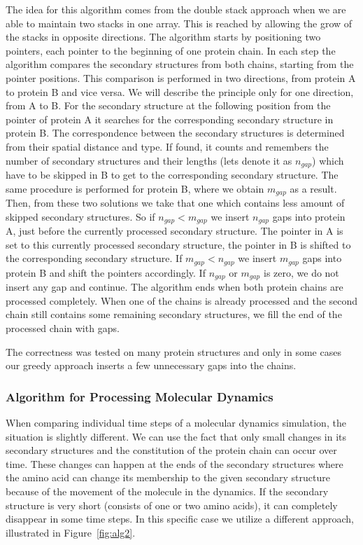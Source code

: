 \documentclass[twocolumn]{bmcart}%
\begin{document}
The idea for this algorithm comes from the double stack approach when we are able to maintain two stacks in one array.
This is reached by allowing the grow of the stacks in opposite directions.
The algorithm starts by positioning two pointers, each pointer to the beginning of one protein chain.
In each step the algorithm compares the secondary structures from both chains, starting from the pointer positions.
This comparison is performed in two directions, from protein A to protein B and vice versa.
We will describe the principle only for one direction, from A to B.
For the secondary structure at the following position from the pointer of protein A it searches for the corresponding secondary structure in protein B.
The correspondence between the secondary structures is determined from their spatial distance and type.
If found, it counts and remembers the number of secondary structures and their lengths (lets denote it as $n_{gap}$) which have to be skipped in B to get to the corresponding secondary structure.
The same procedure is performed for protein B, where we obtain $m_{gap}$ as a result.
Then, from these two solutions we take that one which contains less amount of skipped secondary structures.
So if $n_{gap} < m_{gap}$ we insert $n_{gap}$ gaps into protein A, just before the currently processed secondary structure.
The pointer in A is set to this currently processed secondary structure, the pointer in B is shifted to the corresponding secondary structure.
If $m_{gap} < n_{gap}$ we insert $m_{gap}$ gaps into protein B and shift the pointers accordingly.
If $n_{gap}$ or $m_{gap}$ is zero, we do not insert any gap and continue.
The algorithm ends when both protein chains are processed completely.
When one of the chains is already processed and the second chain still contains some remaining secondary structures, we fill the end of the processed chain with gaps.

The correctness was tested on many protein structures and only in some cases our greedy approach inserts a few unnecessary gaps into the chains.

\subsubsection*{Algorithm for Processing Molecular Dynamics}
When comparing individual time steps of a molecular dynamics simulation, the situation is slightly different. 
We can use the fact that only small changes in its secondary structures and the constitution of the protein chain can occur over time.
These changes can happen at the ends of the secondary structures where the amino acid can change its membership to the given secondary structure because of the movement of the molecule in the dynamics.
If the secondary structure is very short (consists of one or two amino acids), it can completely disappear in some time steps.
In this specific case we utilize a different approach, illustrated in Figure~\ref{fig:alg2}.
\end{document}
